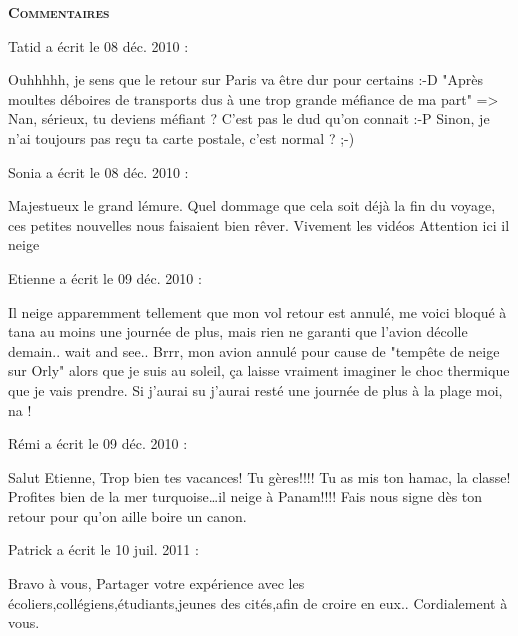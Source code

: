 \bigskip
\textbf{\textsc{Commentaires}}

\medskip
Tatid a écrit le 08 déc. 2010 :
\begin{displayquote}
Ouhhhhh, je sens que le retour sur Paris va être dur pour certains :-D
"Après moultes déboires de transports dus à une trop grande méfiance de ma part" => Nan, sérieux, tu deviens méfiant ? C'est pas le dud qu'on connait :-P
Sinon, je n'ai toujours pas reçu ta carte postale, c'est normal ? ;-)
\end{displayquote}

\medskip
Sonia a écrit le 08 déc. 2010 :
\begin{displayquote}
Majestueux le grand lémure.
Quel dommage que cela soit déjà la fin du voyage, ces petites nouvelles nous faisaient bien rêver.
Vivement les vidéos
Attention ici il neige
\end{displayquote}

\medskip
Etienne a écrit le 09 déc. 2010 :
\begin{displayquote}
Il neige apparemment tellement que mon vol retour est annulé, me voici bloqué à tana au moins une journée de plus, mais rien ne garanti que l'avion décolle demain.. wait and see..
Brrr, mon avion annulé pour cause de "tempête de neige sur Orly" alors que je suis au soleil, ça laisse vraiment imaginer le choc thermique que je vais prendre. Si j'aurai su j'aurai resté une journée de plus à la plage moi, na !
\end{displayquote}

\medskip
Rémi a écrit le 09 déc. 2010 :
\begin{displayquote}
Salut Etienne,
Trop bien tes vacances!
Tu gères!!!! Tu as mis ton hamac, la classe!
Profites bien de la mer turquoise\dots il neige à Panam!!!!
Fais nous signe dès ton retour pour qu'on aille boire un canon.
\end{displayquote}

\medskip
Patrick a écrit le 10 juil. 2011 :
\begin{displayquote}
Bravo à vous,
Partager votre expérience avec les écoliers,collégiens,étudiants,jeunes des cités,afin de croire en eux..
Cordialement à vous.
\end{displayquote}

\vfill

